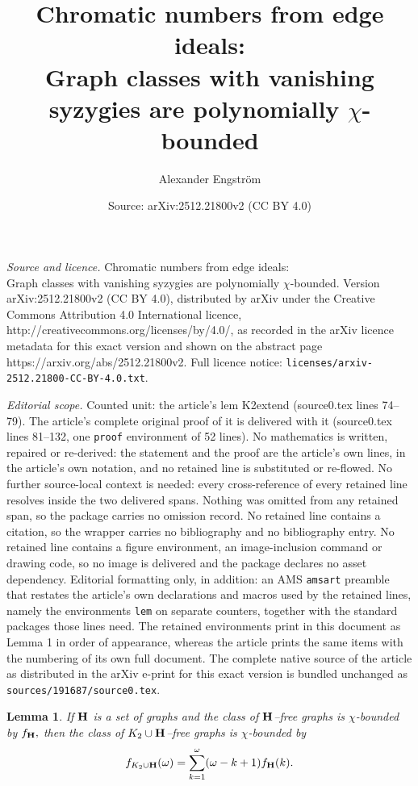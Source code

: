 \documentclass[10pt,a4paper]{amsart}
\title{Chromatic numbers from edge ideals:\\ Graph classes with vanishing syzygies are polynomially $\chi$-bounded}
\author{Alexander Engstr\"om}
\date{Source: arXiv:2512.21800v2 (CC BY 4.0)}
\newtheorem{lem}{Lemma}
\begin{document}
\maketitle

\noindent\emph{Source and licence.} Chromatic numbers from edge ideals:\\ Graph classes with vanishing syzygies are polynomially $\chi$-bounded. Version arXiv:2512.21800v2 (CC BY 4.0), distributed by arXiv under the Creative Commons Attribution 4.0 International licence, http://creativecommons.org/licenses/by/4.0/, as recorded in the arXiv licence metadata for this exact version and shown on the abstract page https://arxiv.org/abs/2512.21800v2. Full licence notice: \texttt{licenses/arxiv-2512.21800-CC-BY-4.0.txt}.\par\smallskip

\noindent\textit{Editorial scope.} Counted unit: the article's lem K2extend (source0.tex lines 74--79). The article's complete original proof of it is delivered with it (source0.tex lines 81--132, one \texttt{proof} environment of 52 lines). No mathematics is written, repaired or re-derived: the statement and the proof are the article's own lines, in the article's own notation, and no retained line is substituted or re-flowed.  No further source-local context is needed: every cross-reference of every retained line resolves inside the two delivered spans.  Nothing was omitted from any retained span, so the package carries no omission record.  No retained line contains a citation, so the wrapper carries no bibliography and no bibliography entry.  No retained line contains a figure environment, an image-inclusion command or drawing code, so no image is delivered and the package declares no asset dependency.  Editorial formatting only, in addition: an AMS \texttt{amsart} preamble that restates the article's own declarations and macros used by the retained lines, namely the environments \texttt{lem} on separate counters, together with the standard packages those lines need.  The retained environments print in this document as Lemma 1 in order of appearance, whereas the article prints the same items with the numbering of its own full document.  The complete native source of the article as distributed in the arXiv e-print for this exact version is bundled unchanged as \texttt{sources/191687/source0.tex}.
\begin{lem}\label{K2extend}
If ${\bf H}$ is a set of graphs and the class of ${\bf H}$--free graphs is  $\chi$-bounded by $f_{\bf H},$ then the class of  $K_2 \cup {\bf H  } $--free graphs is $\chi$-bounded by
\[
f_{K_2 \cup {\bf H  } }(\omega) = \sum_{k=1}^{\omega}  (\omega-k+1)  f_{{\bf H  } }(k).
\]
\end{lem}
\end{document}
